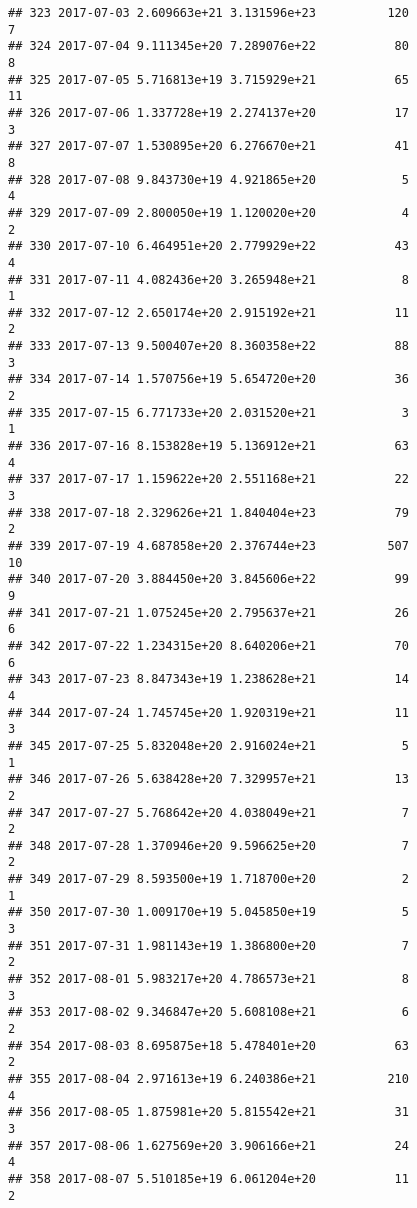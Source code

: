 \documentclass[]{article}
\begin{document}
\begin{verbatim}
## 323 2017-07-03 2.609663e+21 3.131596e+23          120               7
## 324 2017-07-04 9.111345e+20 7.289076e+22           80               8
## 325 2017-07-05 5.716813e+19 3.715929e+21           65              11
## 326 2017-07-06 1.337728e+19 2.274137e+20           17               3
## 327 2017-07-07 1.530895e+20 6.276670e+21           41               8
## 328 2017-07-08 9.843730e+19 4.921865e+20            5               4
## 329 2017-07-09 2.800050e+19 1.120020e+20            4               2
## 330 2017-07-10 6.464951e+20 2.779929e+22           43               4
## 331 2017-07-11 4.082436e+20 3.265948e+21            8               1
## 332 2017-07-12 2.650174e+20 2.915192e+21           11               2
## 333 2017-07-13 9.500407e+20 8.360358e+22           88               3
## 334 2017-07-14 1.570756e+19 5.654720e+20           36               2
## 335 2017-07-15 6.771733e+20 2.031520e+21            3               1
## 336 2017-07-16 8.153828e+19 5.136912e+21           63               4
## 337 2017-07-17 1.159622e+20 2.551168e+21           22               3
## 338 2017-07-18 2.329626e+21 1.840404e+23           79               2
## 339 2017-07-19 4.687858e+20 2.376744e+23          507              10
## 340 2017-07-20 3.884450e+20 3.845606e+22           99               9
## 341 2017-07-21 1.075245e+20 2.795637e+21           26               6
## 342 2017-07-22 1.234315e+20 8.640206e+21           70               6
## 343 2017-07-23 8.847343e+19 1.238628e+21           14               4
## 344 2017-07-24 1.745745e+20 1.920319e+21           11               3
## 345 2017-07-25 5.832048e+20 2.916024e+21            5               1
## 346 2017-07-26 5.638428e+20 7.329957e+21           13               2
## 347 2017-07-27 5.768642e+20 4.038049e+21            7               2
## 348 2017-07-28 1.370946e+20 9.596625e+20            7               2
## 349 2017-07-29 8.593500e+19 1.718700e+20            2               1
## 350 2017-07-30 1.009170e+19 5.045850e+19            5               3
## 351 2017-07-31 1.981143e+19 1.386800e+20            7               2
## 352 2017-08-01 5.983217e+20 4.786573e+21            8               3
## 353 2017-08-02 9.346847e+20 5.608108e+21            6               2
## 354 2017-08-03 8.695875e+18 5.478401e+20           63               2
## 355 2017-08-04 2.971613e+19 6.240386e+21          210               4
## 356 2017-08-05 1.875981e+20 5.815542e+21           31               3
## 357 2017-08-06 1.627569e+20 3.906166e+21           24               4
## 358 2017-08-07 5.510185e+19 6.061204e+20           11               2

\end{verbatim}
\end{document}
